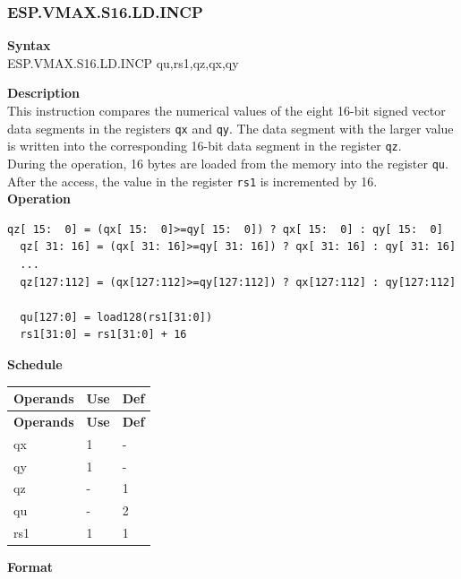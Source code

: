 \newpage
\subsubsection{ESP.VMAX.S16.LD.INCP}\label{instruction:ESPVMAXS16LDINCP}
\textbf{Syntax}\\
ESP.VMAX.S16.LD.INCP qu,rs1,qz,qx,qy

\textbf{Description}\\
This instruction compares the numerical values of the eight 16-bit signed vector data segments in the registers \lstinline{qx} and \lstinline{qy}. The data segment with the larger value is written into the corresponding 16-bit data segment in the register \lstinline{qz}.\\During the operation, 16 bytes are loaded from the memory into the register \lstinline{qu}. After the access, the value in the register \lstinline{rs1} is incremented by 16.\\
\textbf{Operation}
\begin{lstlisting}[escapeinside=`?]
  qz[ 15:  0] = (qx[ 15:  0]>=qy[ 15:  0]) ? qx[ 15:  0] : qy[ 15:  0]
  qz[ 31: 16] = (qx[ 31: 16]>=qy[ 31: 16]) ? qx[ 31: 16] : qy[ 31: 16]
  ...
  qz[127:112] = (qx[127:112]>=qy[127:112]) ? qx[127:112] : qy[127:112]

  qu[127:0] = load128(rs1[31:0])
  rs1[31:0] = rs1[31:0] + 16
\end{lstlisting}

\textbf{Schedule}\\
\begin{longtable}[c]{|l|l|l|}
    \hline
    \rowcolor{lightgray}
    \textbf{Operands} & \textbf{Use} & \textbf{Def} \\\hline
    \endfirsthead
    \hline
    \rowcolor{lightgray}
     \textbf{Operands} & \textbf{Use} & \textbf{Def} \\\hline
    \endhead
    \hline
    \endfoot

    qx & 1 & - \\\hline
  qy & 1 & - \\\hline
     qz & - & 1 \\\hline
     qu & - & 2 \\\hline
     rs1 & 1 & 1

\end{longtable}

\textbf{Format}\\


